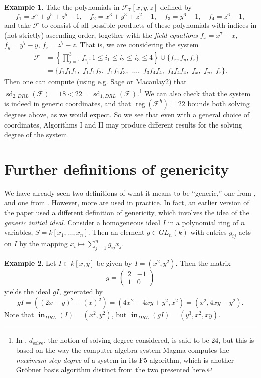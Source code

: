 \documentclass[11pt]{article}
\newcommand{\F}{\mathcal{F}}
\DeclareMathOperator{\Init}{\mathbf{in}}
\DeclareMathOperator{\sd}{sd}
\DeclareMathOperator{\reg}{reg}
\theoremstyle{definition}
\newtheorem{example}{Example}
\begin{document}
\begin{example}\label{minko}
	Take the polynomials in $\mathbb{\F}_7[x,y,z]$ defined by \[ f_1 = x^5 + y^5 + z^5 - 1, \quad f_2 = x^3 + y^3 + z^2 - 1, \quad f_3 = y^6 - 1, \quad f_4 = z^6 - 1, \] and take $\F$ to consist of all possible products of these polynomials with indices in (not strictly) ascending order, together with the \emph{field equations} $f_x = x^7 - x$, $f_y = y^7 - y$, $f_z = z^7 - z$. That is, we are considering the system \begin{align*}
		\F &= \left\{ \prod_{j = 1}^3 f_{i_j} : 1 \leq i_1 \leq i_2 \leq i_3 \leq 4 \right\} \cup \{f_x, f_y, f_z\} \\
		&= \{f_1 f_1 f_1, \,\, f_1 f_1 f_2, \,\, f_1 f_1 f_3, \,\, \dots, \,\, f_3 f_4 f_4, \,\, f_4 f_4 f_4, \,\, f_x, \,\, f_y, \,\, f_z\}. 
	\end{align*} Then one can compute (using e.g. Sage or Macaulay2) that $\sd_{2,DRL}(\F) = 18 < 22 = \sd_{1,DRL}(\F)$.\footnote{In \cite{minko2021security}, $d_{\text{solve}}$, the notion of solving degree considered, is said to be 24, but this is based on the way the computer algebra system Magma computes the \emph{maximum step degree} of a system in its F5 algorithm, which is another Gröbner basis algorithm distinct from the two presented here.} We can also check that the system is indeed in generic coordinates, and that $\reg(\F^h) = 22$ bounds both solving degrees above, as we would expect. So we see that even with a general choice of coordinates, Algorithms I and II may produce different results for the solving degree of the system.  
\end{example}


\section{Further definitions of genericity}

We have already seen two definitions of what it means to be ``generic,'' one from \cite{bayer1987criterion}, and one from \cite{caminata2020solving}. However, more are used in practice. In fact, an earlier version of the \cite{caminata2020solving} paper used a different definition of genericity, which involves the idea of the \emph{generic initial ideal}. Consider a homogeneous ideal $I$ in a polynomial ring of $n$ variables, $S = k[x_1, \dots, x_n]$. Then an element $g \in GL_n(k)$ with entries $g_{ij}$ acts on $I$ by the mapping $x_i \mapsto \sum_{j = 1}^n g_{ij} x_j$. 

\begin{example}
	Let $I \subset k[x,y]$ be given by $I = (x^2, y^2)$. Then the matrix \[ g = \begin{pmatrix}
	2 & -1 \\
	1 & 0
\end{pmatrix} \] yields the ideal $gI$, generated by \[ gI = \left((2x - y)^2 + (x)^2\right) = (4x^2 - 4xy + y^2, x^2) = (x^2, 4xy - y^2). \] Note that $\Init_{DRL}(I) = (x^2, y^2)$, but $\Init_{DRL}(gI) = (y^3, x^2, xy)$. 
\end{example}
\end{document}
